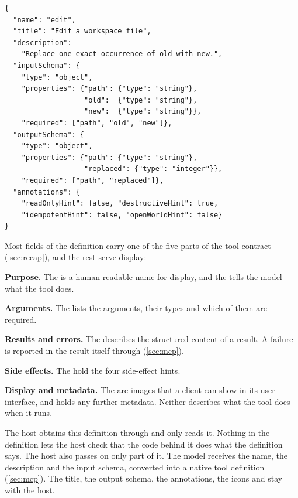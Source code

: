 \noindent\begin{minipage}{\linewidth}
\begin{lstlisting}[basicstyle=\ttfamily\footnotesize, caption={The tool definition that the SDK
generates from the code of \cref{lst:mcpcontract-decorator}, abridged by leaving out the titles
that the SDK adds to each schema and to every property.},
label=lst:mcpcontract-definition]
{
  "name": "edit",
  "title": "Edit a workspace file",
  "description":
    "Replace one exact occurrence of old with new.",
  "inputSchema": {
    "type": "object",
    "properties": {"path": {"type": "string"},
                   "old":  {"type": "string"},
                   "new":  {"type": "string"}},
    "required": ["path", "old", "new"]},
  "outputSchema": {
    "type": "object",
    "properties": {"path": {"type": "string"},
                   "replaced": {"type": "integer"}},
    "required": ["path", "replaced"]},
  "annotations": {
    "readOnlyHint": false, "destructiveHint": true,
    "idempotentHint": false, "openWorldHint": false}
}
\end{lstlisting}
\end{minipage}

Most fields of the definition carry one of the five parts of the tool contract (\cref{sec:recap}),
and the rest serve display:
\bi
\item \textbf{Purpose.} The  is a human-readable name for display, and the
 tells the model what the tool does.
\item \textbf{Arguments.} The  lists the arguments, their types and which of
them are required.
\item \textbf{Results and errors.} The  describes the structured content of a
result. A failure is reported in the result itself through  (\cref{sec:mcp}).
\item \textbf{Side effects.} The  hold the four side-effect hints.
\item \textbf{Display and metadata.} The  are images that a client can show in its
user interface, and  holds any further metadata. Neither describes what the tool
does when it runs.
\ei

The host obtains this definition through  and only reads it. Nothing in the
definition lets the host check that the code behind it does what the definition says. The host also
passes on only part of it. The model receives the name, the description and the input schema,
converted into a native tool definition (\cref{sec:mcp}). The title, the output schema, the
annotations, the icons and  stay with the host.

